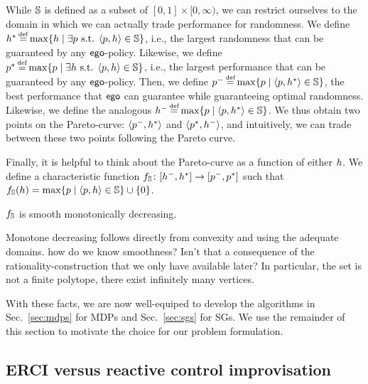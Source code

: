 While $\mathbb{S}$ is defined as a subset of $[0,1] \times [0,\infty)$, we can restrict ourselves to the domain in which we can actually trade performance for randomness. 
We define 
$\rndopt \eqdef \max \{ \rndp \mid \exists \scp \text{ s.t. } \langle \scp, \rndp \rangle \in \solutions  \} $, i.e., the largest randomness that can be guaranteed by any $\mathsf{ego}$-policy. 
Likewise, we define 
$\scopt \eqdef \max \{ \scp \mid \exists \rndp \text{ s.t. } \langle \scp, \rndp \rangle \in \solutions  \} $, i.e., the largest performance that can be guaranteed by any $\mathsf{ego}$-policy. 
Then, we define 
$\scmin \eqdef \max \{ \scp \mid \langle \scp, \rndopt \rangle  \in \solutions \}$, the best performance that $\mathsf{ego}$ can guarantee while guaranteeing optimal randomness. 
Likewise, we define  the analogous $\rndmin \eqdef \max \{ \scp \mid \langle \scp, \rndopt \rangle  \in \solutions \}$.
We thus obtain two points on the Pareto-curve: $\langle p^{-}, h^{*} \rangle$ and $\langle p^{*}, h^{-} \rangle$, and intuitively, we can trade between these two points following the Pareto curve.


Finally, it is helpful to think about the Pareto-curve as a function of either $h$. 
We define a characteristic function $f_\mathbb{S}\colon [h^{-},h^{*}] \rightarrow [p^{-},p^{*}]$ such that $f_\mathbb{S}(h) = \max \{ p \mid \langle p, h \rangle \in \mathbb{S} \} \cup \{ 0 \}$.  
\begin{proposition}
	$f_\mathbb{S}$ is smooth monotonically decreasing. 
\end{proposition}
Monotone decreasing follows directly from convexity and using the adequate domains. 
{\color{red}how do we know smoothness? Isn't that a consequence of the rationality-construction that we only have available later?}
In particular, the set is not a finite polytope, there exist infinitely many vertices.


With these facts, we are now well-equiped to develop the algorithms in Sec.~\ref{sec:mdps} for MDPs and Sec.~\ref{sec:sgs} for SGs.
We use the remainder of this section to motivate the choice for our problem formulation.

\subsection{ERCI versus reactive control improvisation}

